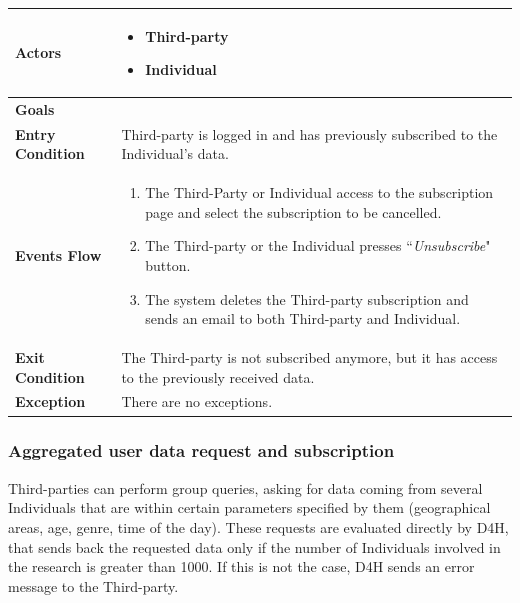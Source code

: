             \begin{table}[H]
            	\centering
                
                \begin{tabular}{|p{3cm}|p{8.2cm}|}
                    \hline
                    \textbf{Actors} &  \begin{itemize}
                                            \item Third-party
                                            \item Individual
                                        \end{itemize}\\
                     \hline
                    \textbf{Goals} & \\ 
                     \hline
                    \textbf{Entry Condition} & Third-party is logged in and has previously subscribed to the Individual's data.\\
                     \hline
                    \textbf{Events Flow} & \begin{enumerate}
                                                \item The Third-Party or Individual access to the subscription page and select the subscription to be cancelled.
                                                \item The Third-party or the Individual presses ``\emph{Unsubscribe}" button.
                                                \item The system deletes the Third-party subscription and sends an email to both Third-party and Individual.
                                            \end{enumerate}\\
                     \hline
                    \textbf{Exit Condition} & The Third-party is not subscribed anymore, but it has access to the previously received data. \\
                     \hline
                    \textbf{Exception} & There are no exceptions. \\
                     \hline
                \end{tabular}  
            \end{table} 
            
        \subsubsection{Aggregated user data request and subscription}
            Third-parties can perform group queries, asking for data coming from several Individuals that are within certain parameters specified by them (geographical areas, age, genre, time of the day). These requests are evaluated directly by D4H, that sends back the requested data only if the number of Individuals involved in the research is greater than 1000. If this is not the case, D4H sends an error message to the Third-party.

